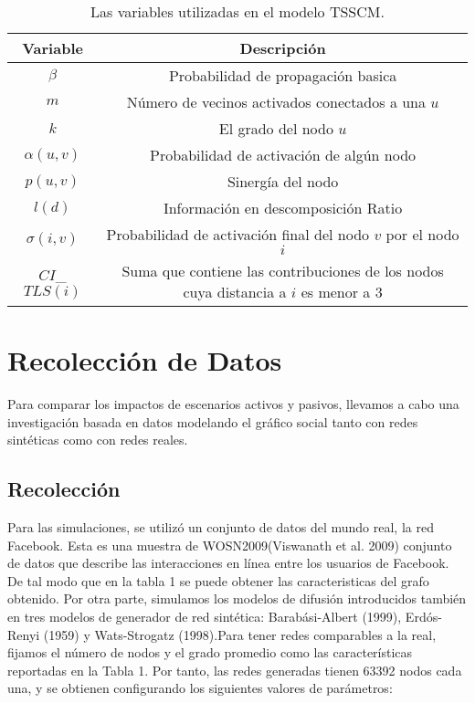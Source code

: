 \documentclass{article}
\begin{document}
\begin{table}[h]
	\begin{center}
		\begin{tabular}{| c | c |}
			\hline
			\textbf{Variable} & \textbf{Descripción} \\ 
			\hline
			$\beta$ & Probabilidad de propagación basica \\
			$m$ & Número de vecinos activados conectados a una $u$\\
			$k$ & El grado del nodo $u$\\
			$\alpha(u,v)$ & Probabilidad de activación de algún nodo\\
			$p(u,v)$ & Sinergía del nodo\\
			$l(d)$ & Información en descomposición Ratio\\
			$\sigma(i,v)$ & Probabilidad de activación final del nodo $v$ por el nodo $i$ \\
			$CI$\_$TLS(i)$ & Suma que contiene las contribuciones de los nodos cuya distancia a $i$ es menor a 3\\
			\hline
		\end{tabular}
		\caption{Las variables utilizadas en el modelo TSSCM.}
		\label{tab:TablaVariables}
	\end{center}
\end{table}

\newpage
\section{Recolección de Datos}
Para comparar los impactos de escenarios activos y pasivos, llevamos a cabo una investigación basada en datos modelando el gráfico social tanto con redes sintéticas como con redes reales.

 \subsection{Recolección}
Para las simulaciones, se utilizó un conjunto de datos del mundo real, la red Facebook. Esta es una muestra de WOSN2009(Viswanath et al. 2009) conjunto de datos que describe las interacciones en línea entre los usuarios de Facebook. De tal modo que en la tabla 1 se puede obtener las caracteristicas del grafo obtenido. 
Por otra parte, simulamos los modelos de difusión introducidos también en tres modelos de generador de red sintética: Barabási-Albert (1999), Erdós-Renyi (1959) y Wats-Strogatz (1998).Para tener redes comparables a la real, fijamos el número de nodos y el grado promedio como las características reportadas en la Tabla 1.
Por tanto, las redes generadas tienen 63392 nodos cada una, y se obtienen configurando los siguientes valores de parámetros:
\end{document}
